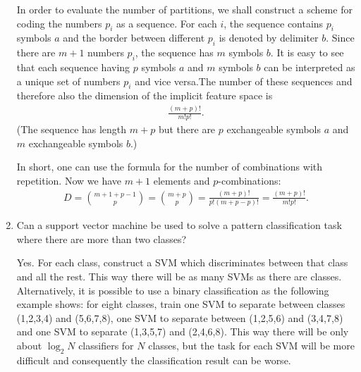 \begin{enumerate}
\begin{solution}
    In order to evaluate the number of partitions, we shall construct a
    scheme for coding the numbers $p_i$ as a sequence.  For each $i$,
    the sequence contains $p_i$ symbols $a$ and the border between
    different $p_i$ is denoted by delimiter $b$.  Since there are $m+1$
    numbers $p_i$, the sequence has $m$ symbols $b$.  It is easy to see
    that each sequence having $p$ symbols $a$ and $m$ symbols $b$ can be
    interpreted as a unique set of numbers $p_i$ and vice versa.The
    number of these sequences and therefore also the dimension of the
    implicit feature space is
    \begin{align*}
      \frac{(m+p)!}{m!p!}.
    \end{align*}
    (The sequence has length $m+p$ but there are $p$ exchangeable
    symbols $a$ and $m$ exchangeable symbols $b$.)
    
    In short, one can use the formula for the number of combinations
    with repetition.  Now we have $m+1$ elements and $p$-combinations:
    \begin{align*}
      D = \binom{m+1+p-1}{p} = \binom{m+p}{p} =
      \frac{(m+p)!}{p!(m+p-p)!}  = \frac{(m+p)!}{m!p!}.
    \end{align*}
  \end{solution}
  

\item Can a support vector machine be used to solve a pattern
  classification task where there are more than two classes?

  \begin{solution}

    Yes.  For each class, construct a SVM which discriminates
    between that class and all the rest.  This way there will be as many
    SVMs as there are classes.  Alternatively, it is possible to use a
    binary classification as the following example shows: for eight
    classes, train one SVM to separate between classes (1,2,3,4) and
    (5,6,7,8), one SVM to separate between (1,2,5,6) and (3,4,7,8) and
    one SVM to separate (1,3,5,7) and (2,4,6,8).  This way there will be
    only about $\log_2 N$ classifiers for $N$ classes, but the task for
    each SVM will be more difficult and consequently the classification
    result can be worse.

  \end{solution}
  

\end{enumerate}

